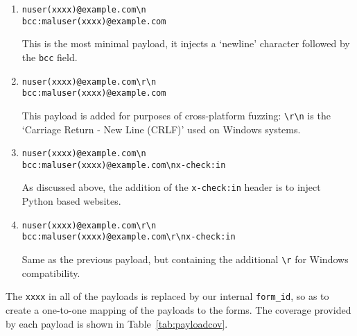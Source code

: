 \begin{enumerate}
	\item
	\texttt{nuser(xxxx)@example.com\textbackslash{}n\\bcc:maluser(xxxx)@example.com} 
	
	This is the most minimal payload, it injects a `newline' character followed by the \texttt{bcc} field.
	
	\item \texttt{nuser(xxxx)@example.com\textbackslash{}r\textbackslash{}n\\bcc:maluser(xxxx)@example.com}
	
	This payload is added for purposes of cross-platform fuzzing: \texttt{\textbackslash{}r\textbackslash{}n} is the `Carriage Return - New Line (CRLF)' used on Windows systems. 
	
	\item \texttt{nuser(xxxx)@example.com\textbackslash{}n\\bcc:maluser(xxxx)@example.com\textbackslash{}nx-check:in}
	
	As discussed above, the addition of the \texttt{x-check:in} header is to inject Python based websites.
	
	\item \texttt{nuser(xxxx)@example.com\textbackslash{}r\textbackslash{}n\\bcc:maluser(xxxx)@example.com\textbackslash{}r\textbackslash{}nx-check:in}
	
	Same as the previous payload, but containing the additional \texttt{\textbackslash{}r} for Windows compatibility.
	
\end{enumerate}
The \texttt{xxxx} in all of the payloads is replaced by our internal \texttt{form\_id}, so as to create a one-to-one mapping of the payloads to the forms. The coverage provided by each payload is shown in Table~\ref{tab:payloadcov}.\\

